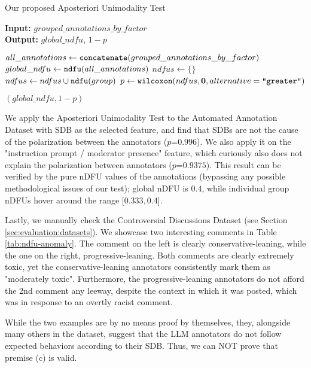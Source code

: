 \begin{algorithm}
	\caption{Our proposed Aposteriori Unimodality Test}
	\label{al:aposteriori_unimodality}
	\hspace*{\algorithmicindent} \textbf{Input:} $grouped\_annotations\_by\_factor$  \\
	\hspace*{\algorithmicindent} \textbf{Output:} $global\_ndfu$, $1 - p$ 
	\begin{algorithmic}[1]
		\State $all\_annotations \gets \texttt{concatenate}(grouped\_annotations\_by\_factor)$ 
		\State $global\_ndfu \gets \texttt{ndfu}(all\_annotations)$ 
		\State
		\State $ndfus \gets \{\}$
		\State $ndfus \gets  ndfus \cup \texttt{ndfu}(group)$ 
		\EndFor
		\State
		\State $p \gets \texttt{wilcoxon}(ndfus, \mathbf{0}, alternative=\texttt{"greater"})$
		
		\State \Return $(global\_ndfu, 1 - p)$
	\end{algorithmic}
\end{algorithm}

We apply the Aposteriori Unimodality Test to the Automated Annotation Dataset with \ac{SDB} as the selected feature, and find that \acp{SDB} are not the cause of the polarization between the annotators ($p\text{=}0.996$). We also apply it on the "instruction prompt / moderator presence" feature, which curiously also does not explain the polarization between annotators ($p\text{=}0.9375$). This result can be verified by the pure \ac{nDFU} values of the annotations (bypassing any possible methodological issues of our test); global \ac{nDFU} is $0.4$, while individual group \acp{nDFU} hover around the range [$0.333, 0.4$]. 

Lastly, we manually check the Controversial Discussions Dataset (see Section \ref{sec:evaluation:datasets}). We showcase two interesting comments in Table \ref{tab:ndfu-anomaly}. The comment on the left is clearly conservative-leaning, while the one on the right, progressive-leaning. Both comments are clearly extremely toxic, yet the conservative-leaning annotators consistently mark them as "moderately toxic". Furthermore, the progressive-leaning annotators do not afford the 2nd comment any leeway, despite the context in which it was posted, which was in response to an overtly racist comment. 

While the two examples are by no means proof by themselves, they, alongside many others in the dataset, suggest that the LLM annotators do not follow expected behaviors according to their \ac{SDB}. Thus, we can NOT prove that premise (c) is valid.

